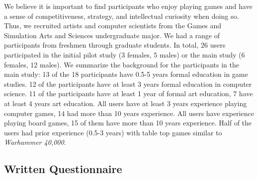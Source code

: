 We believe it is important to find participants who enjoy playing
games and have a sense of competitiveness, strategy, and intellectual
curiosity when doing so.
%
Thus, we recruited artists and computer scientists from the Games and
Simulation Arts and Sciences undergraduate major.
%
%
%
We had a range of participants from freshmen through graduate
students.  
%
In total, 26 users participated in the initial pilot study (3 females,
5 males) or the main study (6 females, 12 males).  
We summarize the background for the participants in the main
study: 13 of the 18 participants 
have 0.5-5 years formal education in game studies.  12 of the
participants have at least 3 years formal education in computer
science.  11 of the participants have at least 1 year of formal art
education, 7 have at least 4 years art education.  All users have at
least 3 years experience playing computer games, 14 had more than 10
years experience.  All users have experience playing board games, 15 of
them have more than 10 years experience.  Half of the users had prior
experience (0.5-3 years) with table top games similar to {\em
  Warhammer 40,000}.  

\vspace{-0.15in}
\subsection{Written Questionnaire}

